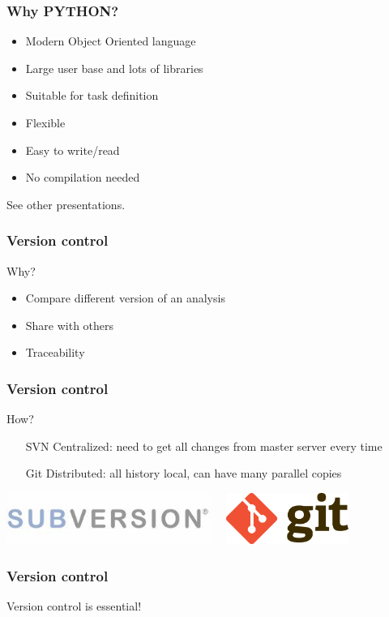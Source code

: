 \documentclass[14pt]{beamer}
\begin{document}
\begin{frame}
\frametitle{Why PYTHON?}
\begin{itemize}
\item Modern Object Oriented language
\item Large user base and lots of libraries
\item Suitable for task definition
\item Flexible
\item Easy to write/read
\item No compilation needed
\end{itemize}
See other presentations.
\end{frame}

\begin{frame}
\frametitle{Version control}
\begin{block}{Why?}
\begin{itemize}
\item Compare different version of an analysis
\item Share with others
\item Traceability
\end{itemize}
\end{block}
\end{frame}
\begin{frame}
\frametitle{Version control}
\begin{block}{How?}
\begin{itemize}
\item[SVN] Centralized: need to get all changes from master server every time
\item[\alert{Git}] Distributed: all history local, can have many parallel copies
\end{itemize}
\includegraphics[width=0.5\textwidth]{svn-name-banner.jpg}$\quad$
\includegraphics[width=0.3\textwidth]{Git-Logo-2Color.png}
\end{block}
\end{frame}

\begin{frame}
\frametitle{Version control}
\centering
\alert{Version control is essential!}
\end{frame}
\end{document}
